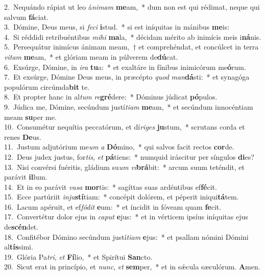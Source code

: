 {2.~}Nequándo rápiat ut leo á\textit{ni}\textit{mam} \textbf{me}am,~* dum non est qui rédimat, neque qui salvum \textbf{fá}ciat.\\
{3.~}Dómine, Deus meus, si \textit{fe}\textit{ci} \textbf{i}stud.~* si est iníquitas in mánibus \textbf{me}is:\\
{4.~}Si réddidi retribuéntibus \textit{mi}\textit{hi} \textbf{ma}la,~* décidam mérito ab inimícis meis i\textbf{ná}nis.\\
{5.~}Persequátur inimícus ánimam meam,~† et comprehéndat, et concúlcet in terra \textit{vi}\textit{tam} \textbf{me}am,~* et glóriam meam in púlverem de\textbf{dú}cat.\\
{6.~}Exsúrge, Dómine, in \textit{i}\textit{ra} \textbf{tu}a:~* et exaltáre in fínibus inimicórum me\textbf{ó}rum.\\
{7.~}Et exsúrge, Dómine Deus meus, in præcépto \textit{quod} \textit{man}\textbf{dá}sti:~* et synagóga populórum circúmda\textbf{bit} te.\\
{8.~}Et propter hanc in al\textit{tum} \textit{re}\textbf{gré}dere:~* Dóminus júdicat \textbf{pó}pulos.\\
{9.~}Júdica me, Dómine, secúndum justí\textit{ti}\textit{am} \textbf{me}am,~* et secúndum innocéntiam meam \textbf{su}per me.\\
{10.~}Consumétur nequítia peccatórum, et dí\textit{ri}\textit{ges} \textbf{ju}stum,~* scrutans corda et renes \textbf{De}us.\\
{11.~}Justum adjutórium me\textit{um} \textit{a} \textbf{Dó}mino,~* qui salvos facit rectos \textbf{cor}de.\\
{12.~}Deus judex justus, for\textit{tis}, \textit{et} \textbf{pá}tiens:~* numquid iráscitur per síngulos \textbf{di}es?\\
{13.~}Nisi convérsi fuéritis, gládium su\textit{um} \textit{vi}\textbf{brá}bit:~* arcum suum teténdit, et parávit \textbf{il}lum.\\
{14.~}Et in eo parávit \textit{va}\textit{sa} \textbf{mor}tis:~* sagíttas suas ardéntibus ef\textbf{fé}cit.\\
{15.~}Ecce partúriit \textit{in}\textit{ju}\textbf{stí}tiam:~* concépit dolórem, et péperit iniqui\textbf{tá}tem.\\
{16.~}Lacum apéruit, et ef\textit{fó}\textit{dit} \textbf{e}um:~* et íncidit in fóveam quam \textbf{fe}cit.\\
{17.~}Convertétur dolor ejus in \textit{ca}\textit{put} \textbf{e}jus:~* et in vérticem ipsíus iníquitas ejus de\textbf{scén}det.\\
{18.~}Confitébor Dómino secúndum justí\textit{ti}\textit{am} \textbf{e}jus:~* et psallam nómini Dómini al\textbf{tís}simi.\\
{19.~}Glória Pa\textit{tri}, \textit{et} \textbf{Fí}lio,~* et Spirítui \textbf{San}cto.\\
{20.~}Sicut erat in princípio, et \textit{nunc}, \textit{et} \textbf{sem}per,~* et in sǽcula sæculórum. \textbf{A}men.\\

